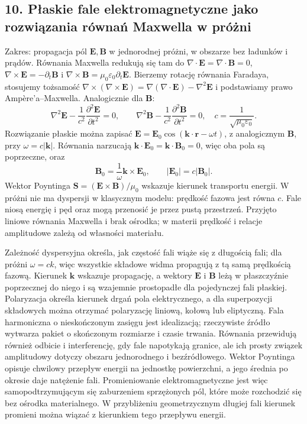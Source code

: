 \documentclass[11pt,a4paper]{article}
\begin{document}
\subsection{10. Płaskie fale elektromagnetyczne jako rozwiązania równań Maxwella w próżni}
Zakres: propagacja pól \(\mathbf E,\mathbf B\) w jednorodnej próżni, w obszarze bez ładunków i prądów. Równania Maxwella redukują się tam do \(\nabla\cdot\mathbf E=\nabla\cdot\mathbf B=0\), \(\nabla\times\mathbf E=-\partial_t\mathbf B\) i \(\nabla\times\mathbf B=\mu_0\varepsilon_0\partial_t\mathbf E\). Bierzemy rotację równania Faradaya, stosujemy tożsamość \(\nabla\times(\nabla\times\mathbf E)=\nabla(\nabla\cdot\mathbf E)-\nabla^2\mathbf E\) i podstawiamy prawo Ampère’a--Maxwella. Analogicznie dla \(\mathbf B\):
\[
\nabla^2\mathbf E-\frac{1}{c^2}\frac{\partial^2\mathbf E}{\partial t^2}=0,\qquad
\nabla^2\mathbf B-\frac{1}{c^2}\frac{\partial^2\mathbf B}{\partial t^2}=0,\quad
c=\frac{1}{\sqrt{\mu_0\varepsilon_0}}.
\]
Rozwiązanie płaskie można zapisać \(\mathbf E=\mathbf E_0\cos(\mathbf k\cdot\mathbf r-\omega t)\), z analogicznym \(\mathbf B\), przy \(\omega=c|\mathbf k|\). Równania narzucają \(\mathbf k\cdot\mathbf E_0=\mathbf k\cdot\mathbf B_0=0\), więc oba pola są poprzeczne, oraz
\[
\mathbf B_0=\frac{1}{\omega}\mathbf k\times\mathbf E_0,\qquad
|\mathbf E_0|=c|\mathbf B_0|.
\]
Wektor Poyntinga \(\mathbf S=(\mathbf E\times\mathbf B)/\mu_0\) wskazuje kierunek transportu energii. W próżni nie ma dyspersji w klasycznym modelu: prędkość fazowa jest równa \(c\). Fale niosą energię i pęd oraz mogą przenosić je przez pustą przestrzeń. Przyjęto liniowe równania Maxwella i brak ośrodka; w materii prędkość i relacje amplitudowe zależą od własności materiału.

Zależność dyspersyjna określa, jak częstość fali wiąże się z długością fali; dla próżni \(\omega=c k\), więc wszystkie składowe widma propagują z tą samą prędkością fazową. Kierunek \(\mathbf k\) wskazuje propagację, a wektory \(\mathbf E\) i \(\mathbf B\) leżą w płaszczyźnie poprzecznej do niego i są wzajemnie prostopadłe dla pojedynczej fali płaskiej. Polaryzacja określa kierunek drgań pola elektrycznego, a dla superpozycji składowych można otrzymać polaryzację liniową, kołową lub eliptyczną. Fala harmoniczna o nieskończonym zasięgu jest idealizacją; rzeczywiste źródło wytwarza pakiet o skończonym rozmiarze i czasie trwania. Równania przewidują również odbicie i interferencję, gdy fale napotykają granice, ale ich prosty związek amplitudowy dotyczy obszaru jednorodnego i bezźródłowego. Wektor Poyntinga opisuje chwilowy przepływ energii na jednostkę powierzchni, a jego średnia po okresie daje natężenie fali. Promieniowanie elektromagnetyczne jest więc samopodtrzymującym się zaburzeniem sprzężonych pól, które może rozchodzić się bez ośrodka materialnego. W przybliżeniu geometrzycznym długiej fali kierunek promieni można wiązać z kierunkiem tego przepływu energii.
\end{document}
